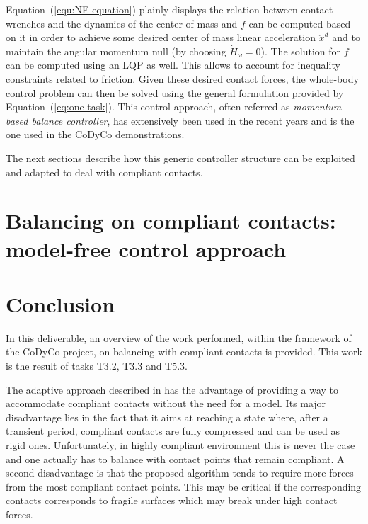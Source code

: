 \documentclass[12pt,a4paper,twoside]{article}
\begin{document}
Equation~(\ref{equ:NE equation}) plainly displays the relation between contact wrenches and the dynamics of the center of mass and $f$ can be computed based on it in order to achieve some desired center of mass linear acceleration $\ddot{x}^d$ and to maintain the angular momentum null (by choosing $\dot{H}_{\omega} = 0$). The solution for $f$ can be computed using an LQP as well. This allows to account for inequality constraints related to friction. Given these desired contact forces, the whole-body control problem can then be solved using the general formulation provided by Equation~(\ref{eq:one task}). This control approach, often referred as \textit{momentum-based balance controller}, has extensively been used in the recent years \cite{Lee&Goswami12,perrin_ISRR2015,Herzog2015} and is the one used in the CoDyCo demonstrations.

The next sections describe how this generic controller structure can be exploited and adapted to deal with compliant contacts.

\section{Balancing on compliant contacts: model-free control approach}



\section{Conclusion}

In this deliverable, an overview of the work performed, within the framework of the CoDyCo project, on balancing with compliant contacts is provided. This work is the result of tasks T3.2, T3.3 and T5.3.

The adaptive approach described in \cite{liu_IROS2015} has the advantage of providing a way to accommodate compliant contacts without the need for a model. Its major disadvantage lies in the fact that it aims at reaching a state where, after a transient period, compliant contacts are fully compressed and can be used as rigid ones. Unfortunately, in highly compliant environment this is never the case and one actually has to balance with contact points that remain compliant. A second disadvantage is that the proposed algorithm tends to require  more forces from the most compliant contact points. This may be critical if the corresponding contacts corresponds to fragile surfaces which may break under high contact forces.\\
\end{document}
